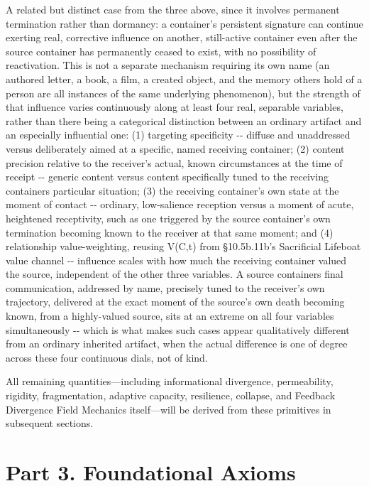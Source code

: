 \documentclass[
]{article}
\begin{document}
A related but distinct case from the three above, since it involves
permanent termination rather than dormancy: a container's persistent
signature can continue exerting real, corrective influence on another,
still-active container even after the source container has permanently
ceased to exist, with no possibility of reactivation. This is not a
separate mechanism requiring its own name (an authored letter, a book, a
film, a created object, and the memory others hold of a person are all
instances of the same underlying phenomenon), but the strength of that
influence varies continuously along at least four real, separable
variables, rather than there being a categorical distinction between an
ordinary artifact and an especially influential one: (1) targeting
specificity -\/- diffuse and unaddressed versus deliberately aimed at a
specific, named receiving container; (2) content precision relative to
the receiver's actual, known circumstances at the time of receipt -\/-
generic content versus content specifically tuned to the receiving
containers particular situation; (3) the receiving container's own state
at the moment of contact -\/- ordinary, low-salience reception versus a
moment of acute, heightened receptivity, such as one triggered by the
source container's own termination becoming known to the receiver at
that same moment; and (4) relationship value-weighting, reusing V(C,t)
from §10.5b.11b's Sacrificial Lifeboat value channel -\/- influence
scales with how much the receiving container valued the source,
independent of the other three variables. A source containers final
communication, addressed by name, precisely tuned to the receiver's own
trajectory, delivered at the exact moment of the source's own death
becoming known, from a highly-valued source, sits at an extreme on all
four variables simultaneously -\/- which is what makes such cases appear
qualitatively different from an ordinary inherited artifact, when the
actual difference is one of degree across these four continuous dials,
not of kind.

All remaining quantities---including informational divergence,
permeability, rigidity, fragmentation, adaptive capacity, resilience,
collapse, and Feedback Divergence Field Mechanics itself---will be
derived from these primitives in subsequent sections.

\hypertarget{part-3.-foundational-axioms}{%
\section{Part 3. Foundational
Axioms}\label{part-3.-foundational-axioms}}
\end{document}

